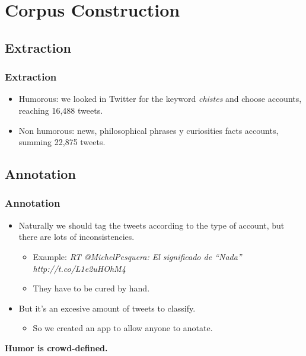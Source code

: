 \section{Corpus Construction}

\subsection{Extraction}
\begin{frame}
    \frametitle{Extraction}

    \begin{itemize}
        \item Humorous: we looked in Twitter for the keyword \emph{chistes} and choose accounts, reaching 16,488 tweets.
        \item Non humorous: news, philosophical phrases y curiosities facts accounts, summing 22,875 tweets.
    \end{itemize}
\end{frame}

\subsection{Annotation}
\begin{frame}
    \frametitle{Annotation}

    \begin{itemize}
        \item Naturally we should tag the tweets according to the type of account, but there are lots of inconsistencies.

        \begin{itemize}
            \item Example: \emph{RT @MichelPesquera: El significado de ``Nada'' http://t.co/L1e2uHOhM4}

            \item They have to be cured by hand.
        \end{itemize}

        \item But it's an excesive amount of tweets to classify.

        \begin{itemize}
            \item So we created an app to allow anyone to anotate.
        \end{itemize}
    \end{itemize}

    \vspace{1cm}

    \begin{center}
        \bf
        Humor is crowd-defined.
    \end{center}
\end{frame}


